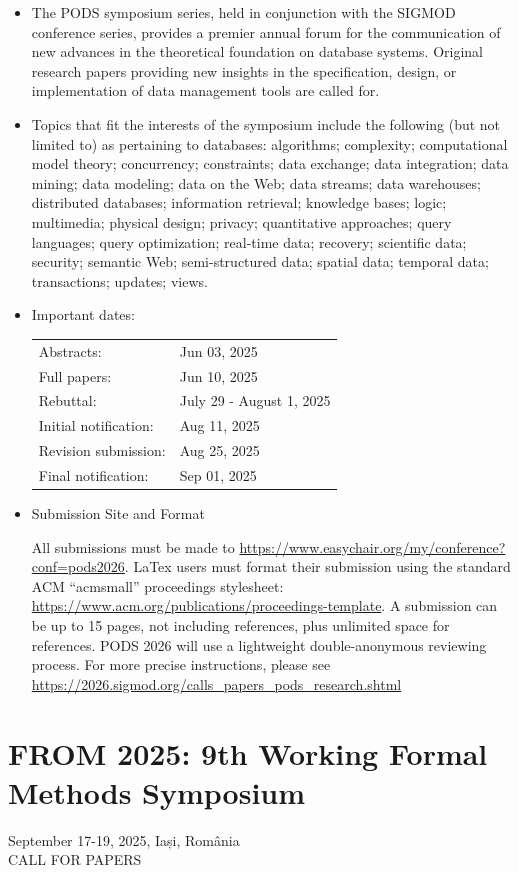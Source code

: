 \documentclass[prodmode,acmtecs]{acmsmall} %
\begin{document}
\begin{itemize}\item  The PODS symposium series, held in conjunction with the SIGMOD conference series, provides a premier annual forum for the communication of new advances in the theoretical foundation on database systems. Original research papers providing new insights in the specification, design, or implementation of data management tools are called for. 
 
\item  Topics that fit the interests of the symposium include the following (but not limited to) as pertaining to databases: algorithms; complexity; computational model theory; concurrency; constraints; data exchange; data integration; data mining; data modeling; data on the Web; data streams; data warehouses; distributed databases; information retrieval; knowledge bases; logic; multimedia; physical design; privacy; quantitative approaches; query languages; query optimization; real-time data; recovery; scientific data; security; semantic Web; semi-structured data; spatial data; temporal data; transactions; updates; views. 
 
\item  Important dates:   
 
\begin{tabulary}{\linewidth}{LL}Abstracts:  & Jun 03, 2025 \\
Full papers:  & Jun 10, 2025 \\
Rebuttal:  & July 29 - August 1, 2025 \\
Initial notification:  & Aug 11, 2025 \\
Revision submission:  & Aug 25, 2025 \\
Final notification:  & Sep 01, 2025 \\
\end{tabulary}
 
\item  Submission Site and Format 
 
  All submissions must be made to \href{https://www.easychair.org/my/conference?conf=pods2026}{https://www.easychair.org/my/conference?conf=pods2026}. LaTex users must format their submission using the standard ACM ``acmsmall'' proceedings stylesheet: \href{https://www.acm.org/publications/proceedings-template}{https://www.acm.org/publications/proceedings-template}. A submission can be up to 15 pages, not including references, plus unlimited space for references. PODS 2026 will use a lightweight double-anonymous reviewing process. For more precise instructions, please see \href{https://2026.sigmod.org/calls_papers_pods_research.shtml}{https://2026.sigmod.org/calls\_papers\_pods\_research.shtml} 
 
\end{itemize}\section{FROM 2025: 9th Working Formal Methods Symposium}\label{FROM2025}  September 17-19, 2025, Iași, România\\ 
CALL FOR PAPERS 
\end{document}
